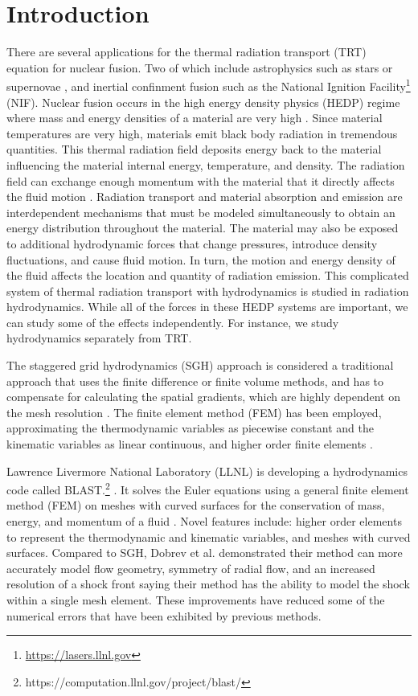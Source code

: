 \documentclass{article}
\begin{document}
\section{Introduction}

There are several applications for the thermal radiation transport (TRT) equation for nuclear fusion. Two of which include astrophysics such as stars or supernovae \cite{Castor_Rad_Hydro}, and inertial confinment fusion such as the National Ignition Facility\footnote{\url{https://lasers.llnl.gov}} (NIF). Nuclear fusion occurs in the high energy density physics (HEDP) regime where mass and energy densities of a material are very high \cite{DrakeHEDPPaper, Castor_Rad_Hydro}. Since material temperatures are very high, materials emit black body radiation in tremendous quantities. This thermal radiation field deposits energy back to the material influencing the material internal energy, temperature, and density. The radiation field can exchange enough momentum with the material that it directly affects the fluid motion \cite{Castor_Rad_Hydro}. Radiation transport and material absorption and emission are interdependent mechanisms that must be modeled simultaneously to obtain an energy distribution throughout the material. The material may also be exposed to additional hydrodynamic forces that change pressures, introduce density fluctuations, and cause fluid motion. In turn, the motion and energy density of the fluid affects the location and quantity of radiation emission. This complicated system of thermal radiation transport with hydrodynamics is studied in radiation hydrodynamics. While all of the forces in these HEDP systems are important, we can study some of the effects independently. For instance, we study hydrodynamics separately from TRT.

The staggered grid hydrodynamics (SGH) approach is considered a traditional approach that uses the finite difference or finite volume methods, and has to compensate for calculating the spatial gradients, which are highly dependent on the mesh resolution \cite{DobrevHOFEMHydro}. The finite element method (FEM) has been employed, approximating the thermodynamic variables as piecewise constant and the kinematic variables as linear continuous\cite{ScovazziQ1P0Hydro}, and higher order finite elements \cite{DobrevCurvilinearFEMHydro}.

Lawrence Livermore National Laboratory (LLNL) is developing a hydrodynamics code called BLAST.\footnote{https://computation.llnl.gov/project/blast/} \cite{DobrevHOFEMHydro}. It solves the Euler equations using a general finite element method (FEM) on meshes with curved surfaces for the conservation of mass, energy, and momentum of a fluid \cite{DobrevCurvilinearFEMHydro}. Novel features include: higher order elements to represent the thermodynamic and kinematic variables, and meshes with curved surfaces. Compared to SGH, Dobrev et al. \cite{DobrevCurvilinearFEMHydro} demonstrated their method can more accurately model flow geometry, symmetry of radial flow, and an increased resolution of a shock front saying their method has the ability to model the shock within a single mesh element. These improvements have reduced some of the numerical errors that have been exhibited by previous methods.
\end{document}
